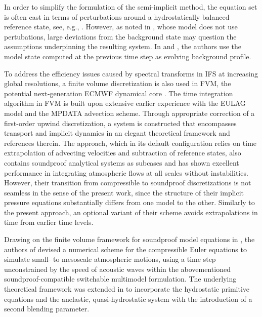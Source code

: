 \documentclass[12pt,a4paper]{article}
\theoremstyle{definition}
\begin{document}
In order to simplify the formulation of the semi-implicit method, the equation set is often cast in terms of perturbations around a hydrostatically balanced reference state, see, e.g., \cite{RestelliGiraldo2009,SmolarkiewiczEtAl2019,SmolarkiewiczEtAl2014}. However, as noted in \cite{WellerShahrokhi2014}, whose model does not use pertubations, large deviations from the background state may question the assumptions underpinning the resulting system. In \cite{WoodEtAl2013} and \cite{MelvinEtAl2018}, the authors use the model state computed at the previous time step as evolving background profile.

To address the efficiency issues caused by spectral transforms in IFS at increasing global resolutions, a finite volume discretization is also used in FVM, the potential next-generation ECMWF dynamical core \cite{KuehnleinEtAl2019}. The time integration algorithm in FVM is built upon extensive earlier experience with the EULAG model and the MPDATA advection scheme. Through appropriate correction of a first-order upwind discretization, a system is constructed that encompasses transport and implicit dynamics in an elegant theoretical framework \cite{SmolarkiewiczEtAl2016, SmolarkiewiczEtAl2014} and references therein. The approach, which in its default configuration relies on time extrapolation of advecting velocities and subtraction of reference states, also contains soundproof analytical systems as subcases and has shown excellent performance in integrating atmospheric flows at all scales without instabilities. However, their transition from compressible to soundproof discretizations is not seamless in the sense of the present work, since the structure of their implicit pressure equations substantially differs from one model to the other. Similarly to the present approach, an optional variant of their scheme avoids extrapolations in time from earlier time levels.

Drawing on the finite volume framework for soundproof model equations in \cite{KleinTCFD2009}, the authors of \cite{Benacchio2014, BenacchioEtAl2014} devised a numerical scheme for the compressible Euler equations to simulate small- to mesoscale atmospheric motions, using a time step unconstrained by the speed of acoustic waves within the abovementioned soundproof-compatible switchable multimodel formulation. The underlying theoretical framework was extended in \cite{KleinBenacchio2016} to incorporate the hydrostatic primitive equations and the anelastic, quasi-hydrostatic system \cite{ArakawaKonor2009} with the introduction of a second blending parameter.
\end{document}

